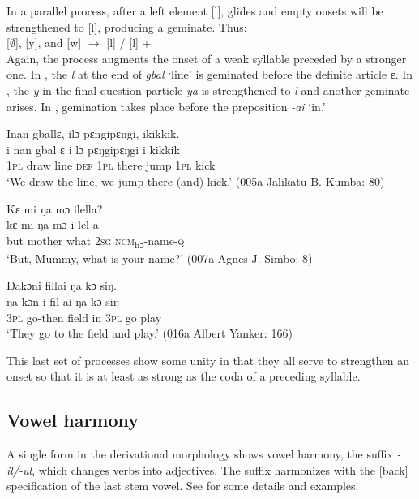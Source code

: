In a parallel process, after a left element [l], glides and empty onsets will be strengthened to [l], producing a geminate. Thus:\\

[${\emptyset}$], [y], and [w] $\xrightarrow{}$ [l] / [l] + {\longrule}\\

Again, the process augments the onset of a weak syllable preceded by a stronger one. In , the \textit{l} at the end of \textit{gbal} ‘line' is geminated before the definite article ɛ. In , the \textit{y} in the final question particle \textit{ya} is strengthened to \textit{l} and another geminate arises. In , gemination takes place before the preposition \textit{{}-ai} ‘in.'

\ea%
    \label{ex:45}
    \ea \label{ex:45a} Inan gballɛ,  ilɔ pɛngipɛngi, ikikkik.\\
    \gll i    nan  gbal  ɛ    i    lɔ    pɛŋgipɛŋgi    i    kikkik\\
    \textsc{1pl}  draw  line  \textsc{def}  \textsc{1pl}  there  jump        \textsc{1pl}  kick\\
\glt ‘We draw the line, we jump there (and) kick.' (005a Jalikatu B. Kumba: 80)

\ex \label{ex:45b}  Kɛ mi ŋa mɔ ilella?\\
\gll kɛ    mi        ŋa    mɔ  i-lel-a\\
but  mother    what  \textsc{2sg}  \textsc{ncm}\textsubscript{hɔ}{}-name-\textsc{q}\\
\glt ‘But, Mummy, what is your name?' (007a Agnes J. Simbo: 8)

\ex \label{ex:45c}  Ŋakɔni fillai ŋa kɔ siŋ.\\
\gll ŋa    kɔn-i    fil    ai    ŋa    kɔ    siŋ\\
\textsc{3pl}  go-then  field  in    \textsc{3pl}  go    play\\
\glt ‘They go to the field and play.' (016a Albert Yanker: 166)
\z
\z

This last set of processes show some unity in that they all serve to strengthen an onset so that it is at least as strong as the coda of a preceding syllable.

\subsection{Vowel harmony}
\label{sec:2.4.4}
A single form in the derivational morphology shows vowel harmony, the suffix \textit{{}\nobreakdash-il/-ul}, which changes verbs into adjectives. The suffix harmonizes with the [back] specification of the last stem vowel. See  for some details and examples.
